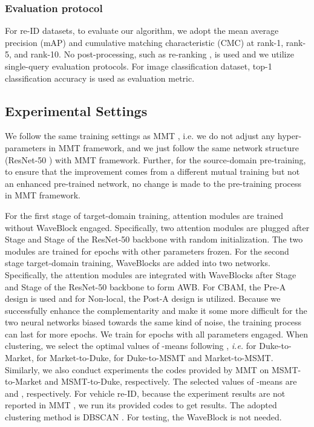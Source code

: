 \documentclass[journal]{IEEEtran}
\begin{document}
\subsubsection{Evaluation protocol} For re-ID datasets, to evaluate our algorithm, we adopt the mean average precision (mAP) and cumulative matching characteristic (CMC) at rank-1, rank-5, and rank-10. No post-processing, such as re-ranking \cite{zhong2017re}, is used and we utilize single-query evaluation protocols. For image classification dataset, top-1 classification accuracy is used as evaluation metric. 
\subsection{Experimental Settings}
We follow the same training settings as MMT \cite{ge2020mutual}, i.e. we do not adjust any hyper-parameters in MMT \cite{ge2020mutual} framework, and we just follow the same network structure (ResNet-50 \cite{he2016deep}) with MMT \cite{ge2020mutual} framework. Further, for the source-domain pre-training, to ensure that the improvement comes from a different mutual training but not an enhanced pre-trained network, no change is made to the pre-training process in MMT \cite{ge2020mutual} framework. \par

For the first stage of target-domain training, attention modules are trained without WaveBlock engaged. Specifically, two attention modules are plugged after Stage  and Stage  of the ResNet-50 \cite{he2016deep} backbone with random initialization. The two modules are trained for  epochs with other parameters frozen. For the second stage target-domain training, WaveBlocks are added into two networks. Specifically, the attention modules are integrated with WaveBlocks after Stage  and Stage  of the ResNet-50 \cite{he2016deep} backbone to form AWB. For CBAM, the Pre-A design is used and for Non-local, the Post-A design is utilized. Because we successfully enhance the complementarity and make it some more difficult for the two neural networks biased towards the same kind of noise, the training process can last for more epochs. We train for  epochs with all parameters engaged. When clustering, we select the optimal  values of -means following \cite{ge2020mutual}, \textit{i.e.}  for Duke-to-Market,  for Market-to-Duke,  for Duke-to-MSMT and Market-to-MSMT. Similarly, we also conduct experiments the codes provided by MMT \cite{ge2020mutual} on MSMT-to-Market and MSMT-to-Duke, respectively. The selected  values of -means are  and , respectively.
For vehicle re-ID, because the experiment results are not reported in MMT \cite{ge2020mutual}, we run its provided codes to get results. The adopted clustering method is DBSCAN \cite{ester1996density}.
For testing, the WaveBlock is not needed.\par 
\end{document}
